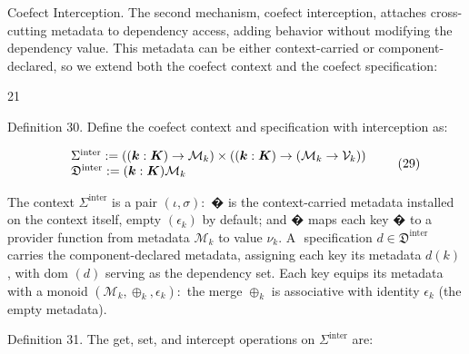 \documentclass[
  10
]{article}
\begin{document}
Coefect Interception. The second mechanism, coefect interception,
attaches cross-cutting metadata to dependency access, adding behavior
without modifying the dependency value. This metadata can be either
context-carried or component-declared, so we extend both the coefect
context and the coefect specification:

21

Definition 30. Define the coefect context and specification with
interception as:

\[
\begin{array} { r l } & { \Sigma ^ { \mathrm { i n t e r } } : = ( ( \boldsymbol { k } : \boldsymbol { K } ) \to \mathcal { M } _ { k } ) \times ( ( \boldsymbol { k } : \boldsymbol { K } ) \to ( \mathcal { M } _ { k } \to \mathcal { V } _ { k } ) ) } \\ & { \mathfrak { D } ^ { \mathrm { i n t e r } } : = ( \boldsymbol { k } : \boldsymbol { K } )  \mathcal { M } _ { k } } \end{array}\tag{29}
\]

The context \(\Sigma ^ { \mathrm { i n t e r } }\) is a pair
\(( \iota , \sigma ) \colon\) � is the context-carried metadata
installed on the context itself, empty
\(\left( \epsilon _ { k } \right)\) by default; and � maps each key � to
a provider function from metadata \(\mathcal { M } _ { k }\) to value
\(\nu _ { k } . \textrm { A }\) specification
\(d \in \mathfrak { D } ^ { \mathrm { i n t e r } }\) carries the
component-declared metadata, assigning each key its metadata \(d ( k )\)
, with dom \(( d )\) serving as the dependency set. Each key equips its
metadata with a monoid
\(( \mathcal { M } _ { k } , \oplus _ { k } , \epsilon _ { k } ) \colon\)
the merge \(\oplus _ { k }\) is associative with identity
\(\epsilon _ { k }\) (the empty metadata).

Definition 31. The get, set, and intercept operations on
\(\Sigma ^ { \mathrm { i n t e r } }\) are:
\end{document}
